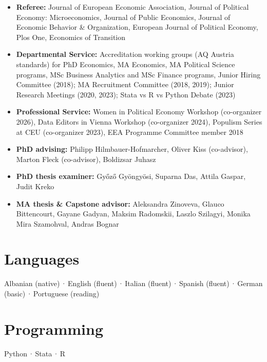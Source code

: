 \documentclass[10pt, a4paper]{article}
\begin{document}
\begin{itemize}
\item \textbf{Referee:} Journal of European Economic Association, Journal of Political Economy: Microeconomics, Journal of Public Economics, Journal of Economic Behavior \& Organization, European Journal of Political Economy, Plos One, Economics of Transition\\

\item \textbf{Departmental Service:} Accreditation working groups (AQ Austria standards) for PhD Economics, MA Economics, MA Political Science programs,  MSc Business Analytics and MSc Finance programs, 
Junior Hiring Committee (2018); MA Recruitment Committee (2018, 2019);
Junior Research Meetings (2020, 2023); Stata vs R vs Python Debate (2023)\\

\item \textbf{Professional Service:} Women in Political Economy Workshop (co-organizer 2026), Data Editors in Vienna Workshop (co-organizer 2024), Populism Series at CEU (co-organizer 2023), EEA Programme Committee member 2018\\

\item \textbf{PhD advising:} Philipp Hilmbauer-Hofmarcher, Oliver Kiss (co-advisor), Marton Fleck (co-advisor), Boldizsar Juhasz\\ 

\item \textbf{PhD thesis examiner:} Gy\H{o}z\H{o} Gy\"{o}ngy\"{o}si, Suparna Das, Attila Gaspar, Judit Kreko\\

\item \textbf{MA  thesis \& Capstone advisor:} Aleksandra Zinoveva, Glauco Bittencourt, Gayane Gadyan, Maksim Radomskii, 
Laszlo Szilagyi, Monika Mira Szamohval, Andras Bognar \\
\end{itemize}

\section{Languages}

{\small Albanian (native)\,·\,English (fluent)\,·\,Italian (fluent)\,·\,Spanish (fluent)\,·\,German (basic)\,·\,Portuguese (reading)}

\section{Programming}
{\small Python\,·\,Stata\,·\,R }
\end{document}
